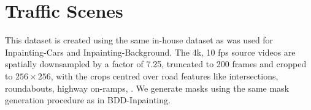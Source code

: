  \section{Traffic Scenes}
This dataset is created using the same in-house dataset as was used for Inpainting-Cars and Inpainting-Background. The 4k, 10 fps source videos are spatially downsampled by a factor of 7.25, truncated to 200 frames and cropped to $256 \times 256$, with the crops centred over road features like intersections, roundabouts, highway on-ramps, \etc. We generate masks using the same mask generation procedure as in BDD-Inpainting. 

